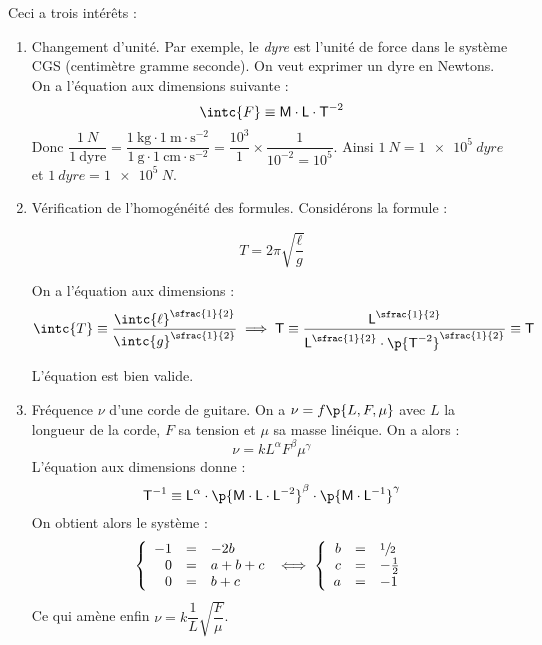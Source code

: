     Ceci a trois intérêts :
    \begin{enumerate}
        \item Changement d'unité. Par exemple, le \textit{dyre} est l'unité de force dans le système \textsc{CGS} (centimètre gramme seconde). On veut exprimer un dyre en Newtons. On a l'équation aux dimensions suivante :
        \[ \intc{F} \equiv \textsf{M} \cdot \textsf{L} \cdot \textsf{T}^{-2}\]
        Donc $\dfrac{\SI{1}{N}}{1 \ \text{dyre}} = \dfrac{\SI{1}{\kg} \cdot \SI{1}{\m\cdot\second^{-2}}}{\SI{1}{\g}\cdot \SI{1}{\cm \cdot \second^{-2}}} = \dfrac{10^3}{1} \times \dfrac{1}{10^{-2} = 10^5}$. Ainsi $\SI{1}{N} = \SI{1e5}{dyre}$ et $\SI{1}{dyre} = \SI{1e5}{N}$.
        
        \item Vérification de l'homogénéité des formules. Considérons la formule :
        
        \[ T = 2\pi \sqrt{\dfrac{\ell}{g}}\]
        
        On a l'équation aux dimensions :
        \[ \intc{T} \equiv \dfrac{\intc{\ell}^{\sfrac{1}{2}}}{\intc{g}^{\sfrac{1}{2}}} \implies \textsf{T} \equiv \dfrac{\textsf{L}^{\sfrac{1}{2}}}{\textsf{L}^{\sfrac{1}{2}}\cdot \p{\textsf{T}^{-2}}^{\sfrac{1}{2}}} \equiv \textsf{T}\]
        
        L'équation est bien valide.
        
        \item Fréquence $\nu$ d'une corde de guitare. On a $\nu = f\p{L, F, \mu}$ avec $L$ la longueur de la corde, $F$ sa tension et $\mu$ sa masse linéique. On a alors :
        \[ \nu = kL^\alpha F^\beta \mu^\gamma\]
        L'équation aux dimensions donne :
        \[ \textsf{T}^{-1} \equiv \textsf{L}^{\alpha} \cdot \p{\textsf{M} \cdot \textsf{L} \cdot \textsf{L}^{-2}}^\beta \cdot \p{\textsf{M} \cdot \textsf{L}^{-1}}^\gamma\]
        On obtient alors le système :
        \[ \left\lbrace\begin{array}{rcl}
            -1 &=& -2b  \\
            0 &=& a + b + c\\
            0 &=& b + c
        \end{array}\right. \iff \left\lbrace\begin{array}{rcl}
            b &=& \sfrac{1}{2}  \\
            c &=& -\frac{1}{2}\\
            a &=& -1
        \end{array}\right. \]
        Ce qui amène enfin $\nu = k\dfrac{1}{L}\sqrt{\dfrac{F}{\mu}}$.
        

\end{enumerate}
